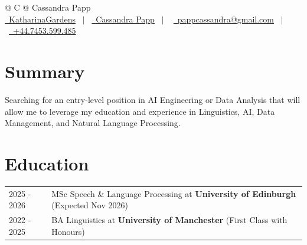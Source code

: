 \documentclass[a4paper,12pt]{article}
\begin{document}
\pagestyle{empty} 



\begin{tabularx}{\linewidth}{@{} C @{}}
\Huge{Cassandra Papp} \\[7.5pt]
\href{https://github.com/KatharinaGardens}{\raisebox{-0.05\height}\faGithub\ KatharinaGardens} \ $|$ \ 
\href{https://linkedin.com/in/cassandra-papp}{\raisebox{-0.05\height}\faLinkedin\ Cassandra Papp} \ $|$ \ 
\href{mailto:pappcassandra@gmail.com}{\raisebox{-0.05\height}\faEnvelope \ pappcassandra@gmail.com} \ $|$ \ 
\href{tel:+447453599485}{\raisebox{-0.05\height}\faMobile \ +44.7453.599.485} \\
\end{tabularx}



\section{Summary}
Searching for an entry-level position in AI Engineering or Data Analysis that will allow me to leverage my education and experience in Linguistics, AI, Data Management, and Natural Language Processing.

\section{Education}
\begin{tabularx}{\linewidth}{@{}l X@{}}	
2025 - 2026 & MSc Speech \& Language Processing at \textbf{University of Edinburgh} \hfill \normalsize (Expected Nov 2026) \\

2022 - 2025 & BA Linguistics at \textbf{University of Manchester} \hfill (First Class with Honours) \\ 

\end{tabularx}
\end{document}
